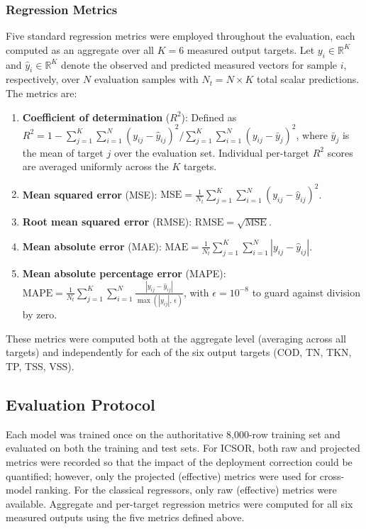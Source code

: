 \documentclass[11pt]{article}
\begin{document}
\subsubsection{Regression Metrics}

Five standard regression metrics were employed throughout the evaluation, each computed as an aggregate over all $K = 6$ measured output targets. Let $y_i \in \mathbb{R}^K$ and $\hat{y}_i \in \mathbb{R}^K$ denote the observed and predicted measured vectors for sample $i$, respectively, over $N$ evaluation samples with $N_t = N \times K$ total scalar predictions. The metrics are:

\begin{enumerate}
\item \textbf{Coefficient of determination} ($R^2$): Defined as $R^2 = 1 - \sum_{j=1}^{K} \sum_{i=1}^{N} (y_{ij} - \hat{y}_{ij})^2 \Big/ \sum_{j=1}^{K} \sum_{i=1}^{N} (y_{ij} - \bar{y}_j)^2$, where $\bar{y}_j$ is the mean of target $j$ over the evaluation set. Individual per-target $R^2$ scores are averaged uniformly across the $K$ targets.

\item \textbf{Mean squared error} (MSE): $\mathrm{MSE} = \frac{1}{N_t} \sum_{j=1}^{K} \sum_{i=1}^{N} (y_{ij} - \hat{y}_{ij})^2$.

\item \textbf{Root mean squared error} (RMSE): $\mathrm{RMSE} = \sqrt{\mathrm{MSE}}$.

\item \textbf{Mean absolute error} (MAE): $\mathrm{MAE} = \frac{1}{N_t} \sum_{j=1}^{K} \sum_{i=1}^{N} |y_{ij} - \hat{y}_{ij}|$.

\item \textbf{Mean absolute percentage error} (MAPE): $\mathrm{MAPE} = \frac{1}{N_t} \sum_{j=1}^{K} \sum_{i=1}^{N} \frac{|y_{ij} - \hat{y}_{ij}|}{\max(|y_{ij}|,\, \epsilon)}$, with $\epsilon = 10^{-8}$ to guard against division by zero.
\end{enumerate}

These metrics were computed both at the aggregate level (averaging across all targets) and independently for each of the six output targets (COD, TN, TKN, TP, TSS, VSS).

\subsection{Evaluation Protocol}

Each model was trained once on the authoritative 8,000-row training set and evaluated on both the training and test sets. For ICSOR, both raw and projected metrics were recorded so that the impact of the deployment correction could be quantified; however, only the projected (effective) metrics were used for cross-model ranking. For the classical regressors, only raw (effective) metrics were available. Aggregate and per-target regression metrics were computed for all six measured outputs using the five metrics defined above.
\end{document}
